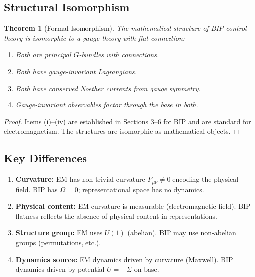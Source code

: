 \documentclass[11pt]{article}
\newtheorem{theorem}{Theorem}[section]
\begin{document}
\subsection{Structural Isomorphism}

\begin{theorem}[Formal Isomorphism]
The mathematical structure of BIP control theory is
isomorphic to a gauge theory with flat connection:
\begin{enumerate}
    \item[(i)] Both are principal $G$-bundles with connections.
    \item[(ii)] Both have gauge-invariant Lagrangians.
    \item[(iii)] Both have conserved Noether currents from gauge symmetry.
    \item[(iv)] Gauge-invariant observables factor through the base in both.
\end{enumerate}
\end{theorem}

\begin{proof}
Items (i)--(iv) are established in Sections 3--6 for BIP and are standard for electromagnetism. The structures are isomorphic as mathematical objects.
\end{proof}

\subsection{Key Differences}

\begin{enumerate}
    \item \textbf{Curvature:} EM has non-trivial curvature $F_{\mu\nu} \neq 0$ encoding the physical field. BIP has
    $\Omega = 0$; representational space has no dynamics.

    \item \textbf{Physical content:} EM curvature is measurable (electromagnetic field). BIP flatness
    reflects the absence of physical content in representations.

    \item \textbf{Structure group:} EM uses $U(1)$ (abelian). BIP may use non-abelian groups (permutations, etc.).

    \item \textbf{Dynamics source:} EM dynamics driven by curvature (Maxwell). BIP dynamics driven
    by potential $U = -\bar{\Sigma}$ on base.
\end{enumerate}
\end{document}

